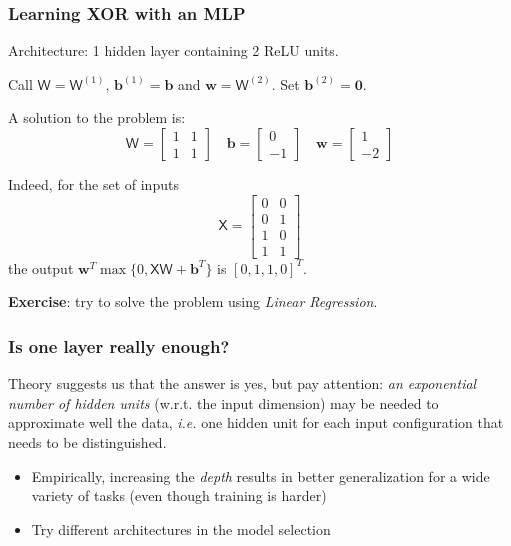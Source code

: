 \documentclass{beamer}
\begin{document}
	\begin{frame}
		\frametitle{Learning XOR with an MLP}
		Architecture: 1 hidden layer containing 2 ReLU units.
		
		\vspace{5mm}
		
		Call $\mathsf{W} = \mathsf{W}^{(1)}$, $\bm{b}^{(1)} = \bm{b}$ and $\bm{w} =  \mathsf{W}^{(2)}$. Set $\bm{b}^{(2)} = \bm{0}$.
		
		\vspace{5mm}
		
		A solution to the problem is:
		$$\mathsf{W} = \begin{bmatrix}
			 1 & 1\\
			 1 & 1
		\end{bmatrix} \quad 
		\bm{b} = \begin{bmatrix}
		0 \\
		-1
		\end{bmatrix} \quad 
		\bm{w} = \begin{bmatrix}
			1 \\
			-2
		\end{bmatrix}
		$$
		
		Indeed, for the set of inputs
		$$\mathsf{X} = \begin{bmatrix}
			0 & 0\\
			0 & 1 \\
			1 & 0 \\
			1 & 1
			\end{bmatrix}
		$$
		the output $\bm{w}^T \max \{0, \mathsf{XW} + \bm{b}^T\}$ is $[0, 1, 1, 0]^T$.
		
		\vspace{5mm}
		
		\textbf{Exercise}: try to solve the problem using \textit{Linear Regression}.
		
	\end{frame}



	\begin{frame}
		\frametitle{Is one layer really enough?}
		Theory suggests us that the answer is yes, but pay attention: \textit{an exponential number of hidden units} (w.r.t. the input dimension) may be needed to approximate well the data, \textit{i.e.} one hidden unit for each input configuration that needs to be distinguished.
		
		\vspace{5mm}
		\begin{itemize}
			\item Empirically, increasing the \textit{depth} results in better generalization for a wide variety of tasks (even though training is harder)
			\item Try different architectures in the model selection
		\end{itemize}
		
	\end{frame}
\end{document}
